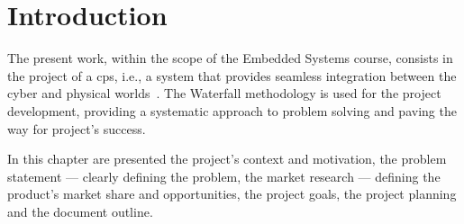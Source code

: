 %
%
%
\chapter{Introduction}%
\label{ch:introduction}
The present work, within the scope of the Embedded Systems course, consists in
the project of a \gls{cps}, i.e., a system that provides
seamless integration between the cyber and physical worlds~\cite{TaoCPS}. The
Waterfall methodology is used for the project development, providing a
systematic approach to problem solving and paving the way for project's success.

In this chapter are presented the project's context and
motivation, the problem statement --- clearly defining the problem, the market
research --- defining the product's market share and opportunities, the project goals, the project planning and the document outline.
%
%
%






%
